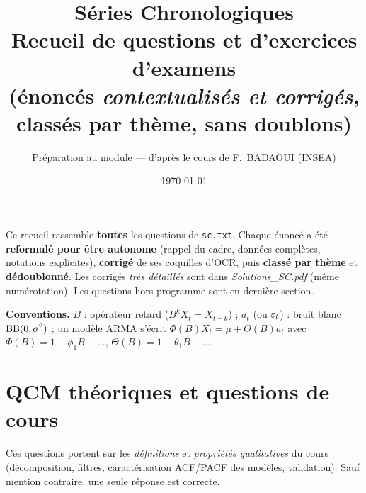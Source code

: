 \documentclass[11pt]{article}
\title{\vspace{-1cm}\textbf{\color{insea}Séries Chronologiques}\\[2mm]
\large Recueil de questions et d'exercices d'examens\\[1mm]
\normalsize (énoncés \emph{contextualisés et corrigés}, classés par thème, sans doublons)}
\author{Préparation au module --- d'après le cours de F.~BADAOUI (INSEA)}
\date{\today}
\begin{document}
\maketitle
\thispagestyle{empty}

\begin{tcolorbox}[colback=insealight,colframe=insea,title={À propos de ce document}]
Ce recueil rassemble \textbf{toutes} les questions de \texttt{sc.txt}. Chaque énoncé a été
\textbf{reformulé pour être autonome} (rappel du cadre, données complètes, notations
explicites), \textbf{corrigé} de ses coquilles d'OCR, puis \textbf{classé par thème} et
\textbf{dédoublonné}. Les corrigés \emph{très détaillés} sont dans \emph{Solutions\_SC.pdf}
(même numérotation). Les questions \horsprog{} hors-programme sont en dernière section.

\smallskip\noindent\textbf{Conventions.} $B$ : opérateur retard ($B^kX_t=X_{t-k}$) ;
$a_t$ (ou $\varepsilon_t$) : bruit blanc $\operatorname{BB}(0,\sigma^2)$ ; un modèle ARMA s'écrit
$\Phi(B)X_t=\mu+\Theta(B)a_t$ avec $\Phi(B)=1-\phi_1B-\dots$, $\Theta(B)=1-\theta_1B-\dots$
\end{tcolorbox}

\tableofcontents
\newpage

\section{QCM théoriques et questions de cours}
\begin{contexte}
Ces questions portent sur les \emph{définitions} et \emph{propriétés qualitatives} du cours
(décomposition, filtres, caractérisation ACF/PACF des modèles, validation). Sauf mention
contraire, une seule réponse est correcte.
\end{contexte}
\end{document}
